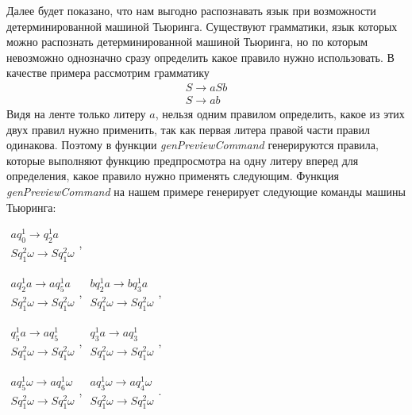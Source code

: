 \documentclass[14pt]{matmex-diploma-custom}
\begin{document}
Далее будет показано, что нам выгодно распознавать язык при возможности детерминированной машиной Тьюринга. Существуют грамматики, язык которых 
можно распознать детерминированной машиной Тьюринга, но по которым невозможно однозначно сразу определить какое правило нужно использовать. В качестве примера рассмотрим грамматику 
$$\begin{array}{lcl}
    S \to a S b \\
    S \to a b
\end{array}$$ 
Видя на ленте только литеру $a$, нельзя одним правилом определить, какое из этих двух правил нужно применить, так как первая литера  правой части правил одинакова. Поэтому в функции \textit{genPreviewCommand} генерируются правила, которые выполняют функцию предпросмотра на одну литеру вперед для определения, какое правило нужно применять следующим. Функция \textit{genPreviewCommand} на нашем примере генерирует следующие команды машины Тьюринга: 

$\begin{array}{lcl}
    a q_0^1 \to q_2^1 a \\
    S q_1^2 \omega \to S q_1^2 \omega 
\end{array}$,

$\begin{array}{lcl}
    a q_2^1 a \to a q_5^1 a \\
    S q_1^2 \omega \to S q_1^2 \omega 
\end{array}$,
$\begin{array}{lcl}
    b q_2^1 a \to b q_3^1 a \\
    S q_1^2 \omega \to S q_1^2 \omega 
\end{array}$,

$\begin{array}{lcl}
    q_5^1 a \to a q_5^1 \\
    S q_1^2 \omega \to S q_1^2 \omega 
\end{array}$,
$\begin{array}{lcl}
    q_3^1 a \to a q_3^1 \\
    S q_1^2 \omega \to S q_1^2 \omega 
\end{array}$,

$\begin{array}{lcl}
    a q_5^1 \omega \to a q_6^1 \omega \\
    S q_1^2 \omega \to S q_1^2 \omega 
\end{array}$,
$\begin{array}{lcl}
    a q_3^1 \omega \to a q_4^1 \omega \\
    S q_1^2 \omega \to S q_1^2 \omega 
\end{array}$.
\end{document}
